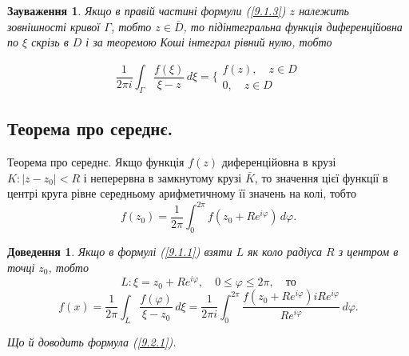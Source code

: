 \documentclass[12pt,fleqn]{article}
\theoremstyle{theorem}
\theoremstyle{proof}
\newtheorem*{dov}{Доведення}
\newtheorem{remark}{Зауваження}[section]
\numberwithin{figure}{section}
\numberwithin{equation}{section}
\begin{document}
\begin{remark}\label{remark_9.1.1}
Якщо в правій частині формули (\ref{9.1.3}) $z$ належить зовнішності кривої $\Gamma$, тобто $z \in \bar{D}$, то підінтегральна функція диференційовна по $\xi$ скрізь в $D$ і за теоремою Коші інтеграл рівний нулю, тобто

\[ \frac{1}{2\pi i} \int_{\Gamma} \frac{f(\xi)}{\xi-z}\,d\xi= \bigg\{ \begin{matrix} f(z), \quad z\in D \\ 0, \quad z \in D \end{matrix} \]

\end{remark}

\subsection{Теорема про середнє.}\label{9.2}
Теорема про середнє. Якщо функція $f(z)$ диференційовна в крузі $K:|z-z_0|<R$ і неперервна в замкнутому крузі $\bar{K}$, то значення цієї функції в центрі круга рівне середньому арифметичному її значень на колі, тобто
\begin{equation}\label{9.2.1}
f(z_0)=\frac{1}{2\pi}\int_{0}^{2\pi}f(z_0+Re^{i\varphi})\,d\varphi.
\end{equation}

\begin{dov}
Якщо в формулі (\ref{9.1.1}) взяти $L$ як коло радіуса $R$ з центром в точці $z_0$, тобто
\[ L: \xi=z_0+Re^{i\varphi},\quad 0\leq\varphi\leq2\pi,\quad \text{то} \]
\[ f(x)=\frac{1}{2\pi}\int_{L}\frac{f(\varphi)}{\xi-z_0}\,d\xi = \frac{1}{2\pi i} \int_{0}^{2\pi}\frac{f(z_0+Re^{i\varphi})iRe^{i\varphi}}{Re^{i\varphi}}\,d\varphi. \]

Що й доводить формула (\ref{9.2.1}).
\end{dov}
\end{document}

